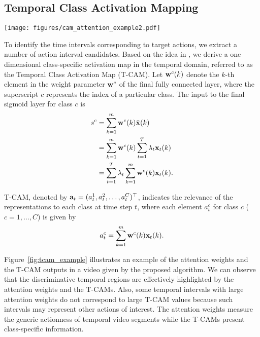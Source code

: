 \documentclass[10pt,twocolumn,letterpaper]{article}
\begin{document}
\subsection{Temporal Class Activation Mapping}
\label{sub:temporal}
\begin{figure*}[ht]
\captionsetup{font=small}
\centering
\texttt{[image: figures/cam\_attention\_example2.pdf]}
    \caption{Illustration of the ground-truth temporal intervals for the {\it ThrowDiscus} class, the temporal attentions, and the T-CAM for an example video in the THUMOS14 dataset~\cite{jiang14thumos}. The horizontal axis in the plots denote the timestamps. In this example, the T-CAM values for {\it ThrowDiscus} provide accurate action localization information.  Note that the temporal attention weights are large at several locations that do not correspond to the ground-truth annotations.  This is because temporal attention weights are trained in a class-agnostic way.}
\label{fig:tcam_example}
\end{figure*}
To identify the time intervals corresponding to target actions, we extract a number of action interval candidates.
Based on the idea in \cite{zhou16learning}, we derive a one dimensional class-specific activation map in the temporal domain, referred to as the Temporal Class Activation Map (T-CAM).
Let ${\bf w}^{c}(k)$ denote the $k$-th element in the weight parameter ${\bf w}^c$ of the final fully connected layer, where the superscript $c$ represents the index of a particular class.
The input to the final sigmoid layer for class $c$ is
\begin{align}
s^c & = \sum_{k=1}^m {\bf w}^{c}(k) \bar{\bf x}(k) \nonumber \\
 & = \sum_{k=1}^m {\bf w}^{c}(k) \sum_{t=1}^T \lambda_t {\bf x}_t(k) \\
 & = \sum_{t=1}^T \lambda_t \sum_{k=1}^m {\bf w}^{c}(k) {\bf x}_t(k). \nonumber
\end{align}


T-CAM, denoted by ${\bf a}_t = (a_t^1, a_t^2, \dots, a_t^{C})^{\top}$, indicates the relevance of the representations to each class at time step $t$, where each element $a_t^c$ for class $c$ ($c = 1, \dots, C$) is given by
\begin{equation}
a_t^c = \sum_{k=1}^m {\bf w}^c(k) {\bf x}_t(k).
\label{eq:t-cam}
\end{equation}


Figure~\ref{fig:tcam_example} illustrates an example of the attention weights and the T-CAM outputs in a video given by the proposed algorithm.
We can observe that the discriminative temporal regions are effectively highlighted by the attention weights and the T-CAMs.
Also, some temporal intervals with large attention weights do not correspond to large T-CAM values because such intervals may represent other actions of interest.
The attention weights measure the generic actionness of temporal video segments while the T-CAMs present class-specific information.
\end{document}
